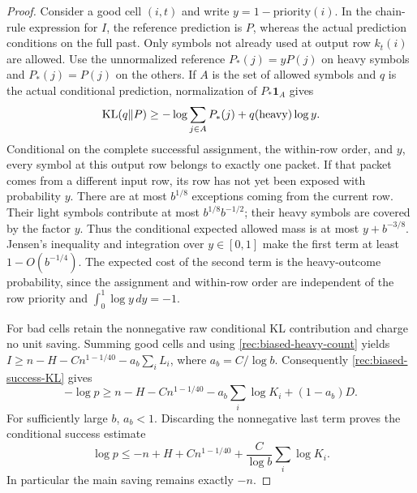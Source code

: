 \begin{proof}
Consider a good cell $(i,t)$ and write $y=1-\text{priority}(i)$.
In the chain-rule expression for $I$, the reference prediction is
$P$, whereas the actual prediction conditions on the full past.
Only symbols not already used at output row $k_t(i)$ are allowed.
Use the unnormalized reference
$P_*(j)=yP(j)$ on heavy symbols and $P_*(j)=P(j)$ on the others.
If $A$ is the set of allowed symbols and $q$ is the actual conditional
prediction, normalization of $P_*\mathbf1_A$ gives
\[
 \operatorname{KL}(q\Vert P)\ge
 -\log\sum_{j\in A}P_*(j)+q(\text{heavy})\log y.
\]
Conditional on the complete successful assignment, the within-row
order, and $y$, every symbol at this output row belongs to exactly
one packet.  If that packet comes from a different input row, its
row has not yet been exposed with probability $y$.  There are at
most $b^{1/8}$ exceptions coming from the current row.  Their light
symbols contribute at most $b^{1/8}b^{-1/2}$; their heavy symbols
are covered by the factor $y$.  Thus the conditional expected
allowed mass is at most $y+b^{-3/8}$.  Jensen's inequality and
integration over $y\in[0,1]$ make the first term at least
$1-O(b^{-1/4})$.  The expected cost of the second term is the
heavy-outcome probability, since the assignment and within-row
order are independent of the row priority and
$\int_0^1\log y\,dy=-1$.

For bad cells retain the nonnegative raw conditional KL contribution
and charge no unit saving.  Summing good cells and using
\eqref{rec:biased-heavy-count} yields
$I\ge n-H-Cn^{1-1/40}-a_b\sum_iL_i$, where $a_b=C/\log b$.
Consequently \eqref{rec:biased-success-KL} gives
\begin{equation}\label{rec:biased-entropy-absorption}
 -\log p\ge n-H-Cn^{1-1/40}
       -a_b\sum_i\log K_i+(1-a_b)D.
\end{equation}
For sufficiently large $b$, $a_b<1$.  Discarding the nonnegative
last term proves the conditional success estimate
\begin{equation}\label{rec:biased-grid-success}
 \log p\le-n+H+Cn^{1-1/40}
                       +\frac{C}{\log b}\sum_i\log K_i.
\end{equation}
In particular the main saving remains exactly $-n$.


\end{proof}
